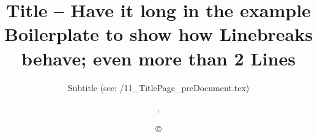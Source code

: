 %
\providecommand{\DenKrTPVersion}{}%
%
%
%
\title[Short Title]{Title -- Have it long in the example Boilerplate to show how Linebreaks behave; even more than 2 Lines}%
\subtitle{Subtitle {(see: \textquotedbl\DenKrLayoutRootDirPATH/11\_TitlePage\_preDocument.tex\textquotedbl)}}%
\author{\DenKrTPauthorLast, \DenKrTPauthorFirst}%
\date[\DenKrTPdate]{\copyright \DenKrTPdate}%
\keywords{\TitlePageDataKeywords}%
\subject{\DenKrTPpublicationType}%